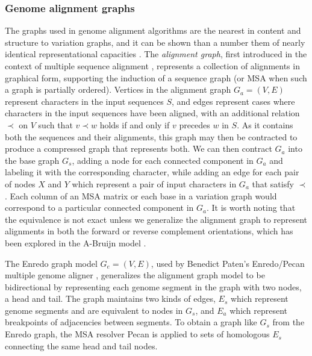 \subsubsection{Genome alignment graphs}
\label{sec:genome_alignment_graphs}
The graphs used in genome alignment algorithms are the nearest in content and structure to variation graphs, and it can be shown than a number them of nearly identical representational capacities \cite{kehr2014genome}.
The \emph{alignment graph}, first introduced in the context of multiple sequence alignment \cite{kececioglu1993maximum,rausch2008segment}, represents a collection of alignments in graphical form, supporting the induction of a sequence graph (or MSA when such a graph is partially ordered).
Vertices in the alignment graph $G_a = (V, E)$ represent characters in the input sequences $S$, and edges represent cases where characters in the input sequences have been aligned, with an additional relation $\prec$ on $V$ such that $v \prec w$ holds if and only if $v$ precedes $w$ in $S$.
As it contains both the sequences and their alignments, this graph may then be contracted to produce a compressed graph that represents both.
We can then contract $G_a$ into the base graph $G_s$, adding a node for each connected component in $G_a$ and labeling it with the corresponding character, while adding an edge for each pair of nodes $X$ and $Y$ which represent a pair of input characters in $G_a$ that satisfy $\prec$.
Each column of an MSA matrix or each base in a variation graph would correspond to a particular connected component in $G_a$.
It is worth noting that the equivalence is not exact unless we generalize the alignment graph to represent alignments in both the forward or reverse complement orientations, which has been explored in the A-Bruijn model \cite{raphael2004novel}.

The Enredo graph model $G_e = (V, E)$, used by Benedict Paten's Enredo/Pecan multiple genome aligner \cite{paten2008enredo}, generalizes the alignment graph model to be bidirectional by representing each genome segment in the graph with two nodes, a head and tail.
The graph maintains two kinds of edges, $E_s$ which represent genome segments and are equivalent to nodes in $G_s$, and $E_a$ which represent breakpoints of adjacencies between segments.
To obtain a graph like $G_s$ from the Enredo graph, the MSA resolver Pecan is applied to sets of homologous $E_s$ connecting the same head and tail nodes.

